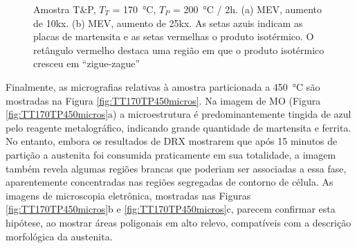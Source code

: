 \begin{figure}
  \centering
  \quad
  \caption{Amostra T\&P, $T_T$ = \SI{170}{\degreeCelsius}, $T_P$ = \SI{200}{\degreeCelsius} / 2h. (a) MEV, aumento de 10kx. (b) MEV, aumento de 25kx. As setas azuis indicam as placas de martensita e as setas vermelhas o produto isotérmico. O retângulo vermelho destaca uma região em que o produto isotérmico cresceu em ``zigue-zague''}
  \label{fig:TT170TP2002hmicros}
\end{figure}


Finalmente, as micrografias relativas à amostra particionada a \SI{450}{\degreeCelsius} são mostradas na Figura \ref{fig:TT170TP450micros}. Na imagem de MO (Figura \ref{fig:TT170TP450micros}a) a microestrutura é predominantemente tingida de azul pelo reagente metalográfico, indicando grande quantidade de martensita e ferrita. No entanto, embora os resultados de DRX mostrarem que após 15 minutos de partição a austenita foi consumida praticamente em sua totalidade, a imagem também revela algumas regiões brancas que poderiam ser associadas a essa fase, aparentemente concentradas nas regiões segregadas de contorno de célula. As imagens de microscopia eletrônica, mostradas nas Figuras \ref{fig:TT170TP450micros}b e \ref{fig:TT170TP450micros}c, parecem confirmar esta hipótese, ao mostrar áreas poligonais em alto relevo, compatíveis com a descrição morfológica da austenita.

